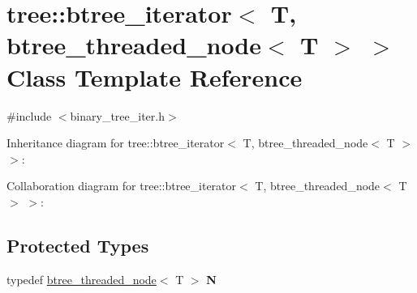 \hypertarget{classtree_1_1btree__iterator_3_01T_00_01btree__threaded__node_3_01T_01_4_01_4}{\section{tree\-:\-:btree\-\_\-iterator$<$ T, btree\-\_\-threaded\-\_\-node$<$ T $>$ $>$ Class Template Reference}
\label{classtree_1_1btree__iterator_3_01T_00_01btree__threaded__node_3_01T_01_4_01_4}
}


{\ttfamily \#include $<$binary\-\_\-tree\-\_\-iter.\-h$>$}



Inheritance diagram for tree\-:\-:btree\-\_\-iterator$<$ T, btree\-\_\-threaded\-\_\-node$<$ T $>$ $>$\-:


Collaboration diagram for tree\-:\-:btree\-\_\-iterator$<$ T, btree\-\_\-threaded\-\_\-node$<$ T $>$ $>$\-:
\subsection*{Protected Types}
\begin{DoxyCompactItemize}
\item 
\hypertarget{classtree_1_1btree__iterator_3_01T_00_01btree__threaded__node_3_01T_01_4_01_4_a4648c4864eba8e9052872c7d992a1114}{typedef \hyperlink{structtree_1_1btree__threaded__node}{btree\-\_\-threaded\-\_\-node}$<$ T $>$ {\bfseries N}}\label{classtree_1_1btree__iterator_3_01T_00_01btree__threaded__node_3_01T_01_4_01_4_a4648c4864eba8e9052872c7d992a1114}

\end{DoxyCompactItemize}
